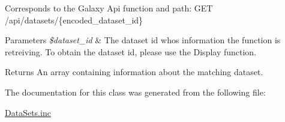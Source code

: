 Corresponds to the Galaxy Api function and path\+: G\+ET /api/datasets/\{encoded\+\_\+dataset\+\_\+id\}


\begin{DoxyParams}{Parameters}
{\em \$dataset\+\_\+id} & The dataset id whos information the function is retreiving. To obtain the dataset id, please use the Display function.\\
\hline
\end{DoxyParams}
\begin{DoxyReturn}{Returns}
An array containing information about the matching dataset. 
\end{DoxyReturn}


The documentation for this class was generated from the following file\+:\begin{DoxyCompactItemize}
\item 
\hyperlink{DataSets_8inc}{Data\+Sets.\+inc}\end{DoxyCompactItemize}
